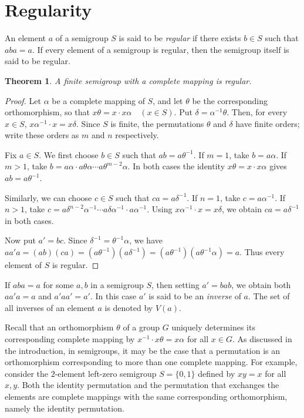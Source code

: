 \documentclass[11pt]{article}
\theoremstyle{plain}
\newtheorem{theorem}{Theorem}[section]
\theoremstyle{remark}
\theoremstyle{definition}
\theoremstyle{plain}
\newcommand{\inv}{^{-1}}
\begin{document}
\section{Regularity}
\label{Sec:regularity}
An element $a$ of a semigroup $S$ is said to be \emph{regular} if there exists $b\in S$ such that $aba=a$. If every element of a semigroup is regular, then the semigroup itself is said to be regular.

\begin{theorem}\label{Thm:regular}
A finite semigroup with a complete mapping is regular.
\end{theorem}

\begin{proof}

Let $\alpha$ be a complete mapping of $S$, and let $\theta$ be the corresponding
orthomorphism, so that
\(x\theta=x\cdot x\alpha \quad (x\in S).\)
Put $\delta=\alpha^{-1}\theta$. Then, for every $x\in S$,
\(x\alpha^{-1}\cdot x=x\delta.\)
Since $S$ is finite, the permutations $\theta$ and $\delta$ have finite orders;
write these orders as $m$ and $n$ respectively.

Fix $a\in S$. We first choose $b\in S$ such that $ab=a\theta^{-1}$.
If $m=1$, take $b=a\alpha$. If $m>1$, take
\(b=a\alpha\cdot a\theta\alpha\cdots a\theta^{m-2}\alpha.\)
In both cases the identity $x\theta=x\cdot x\alpha$ gives $ab=a\theta^{-1}$.

Similarly, we can choose $c\in S$ such that
\(ca=a\delta^{-1}.\)
If $n=1$, take $c=a\alpha^{-1}$. If $n>1$, take
\(c=a\delta^{n-2}\alpha^{-1}\cdots a\delta\alpha^{-1}\cdot a\alpha^{-1}.\)
Using $x\alpha^{-1}\cdot x=x\delta$, we obtain $ca=a\delta^{-1}$ in both
cases.

Now put $a'=bc$. Since $\delta^{-1}=\theta^{-1}\alpha$, we have
\(aa'a=(ab)(ca)=(a\theta^{-1})(a\delta^{-1})=(a\theta^{-1})(a\theta^{-1}\alpha)=a.\)
Thus every element of $S$ is regular.

\end{proof}

If $aba=a$ for some $a,b$ in a semigroup $S$, then setting $a' = bab$, we obtain both $aa'a=a$
and $a'aa'=a'$. In this case $a'$ is said to be an \emph{inverse} of $a$. The set of all inverses of an element $a$ is denoted by $V(a)$.

Recall that an orthomorphism $\theta$ of a group $G$ uniquely determines its corresponding complete mapping by $x\inv\cdot x\theta = x\alpha$
for all $x\in G$. As discussed in the introduction, in semigroups, it may be the case that a permutation is an orthomorphism corresponding
to more than one complete mapping. For example, consider the $2$-element left-zero semigroup $S=\{0,1\}$ defined by $xy=x$ for all $x,y$.
Both the identity permutation and the permutation that exchanges the elements are complete mappings with the same corresponding orthomorphism,
namely the identity permutation.
\end{document}
